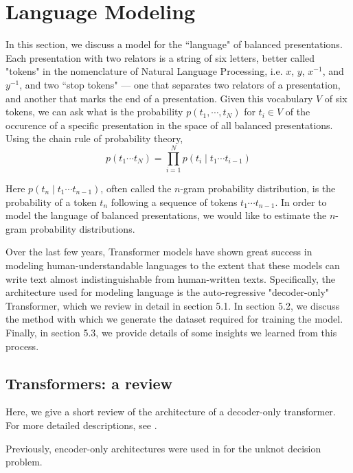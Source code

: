 
\section{Language Modeling}

In this section, we discuss a model for the ``language" of balanced presentations. Each presentation with two relators is a string of six letters, better called "tokens" in the nomenclature of Natural Language Processing, i.e. $x$, $y$, $x^{-1}$, and $y^{-1}$, and two ``stop tokens" --- one that separates two relators of a presentation, and another that marks the end of a presentation. Given this vocabulary $V$ of six tokens, we can ask what is the probability $p(t_1, \cdots, t_N)$ for $t_i \in V$ of the occurence of a specific presentation in the space of all balanced presentations. Using the chain rule of probability theory, 
\[
p(t_1 \cdots t_{N}) = \prod\limits_{i=1}^{N} p (t_{i} \mid t_{1} \cdots t_{i-1}) 
\]

Here $p (t_{n} \mid t_{1} \cdots t_{n-1})$, often called the $n$-gram probability distribution, is the probability of a token $t_n$ following a sequence of tokens $t_{1} \cdots t_{n-1}$. In order to model the language of balanced presentations, we would like to estimate the $n$-gram probability distributions. 

Over the last few years, Transformer models have shown great success in modeling human-understandable languages to the extent that these models can write text almost indistinguishable from human-written texts. Specifically, the architecture used for modeling language is the auto-regressive "decoder-only" Transformer, which we review in detail in section 5.1. In section 5.2, we discuss the method with which we generate the dataset required for training the model. Finally, in section 5.3, we provide details of some insights we learned from this process. 

\subsection{Transformers: a review}

Here, we give a short review of the architecture of a decoder-only transformer. For more detailed descriptions, see \cite{elhage2021mathematical, vaswani2023attention, douglas2023large}. 


Previously, encoder-only architectures were used in  for the unknot decision problem. 

